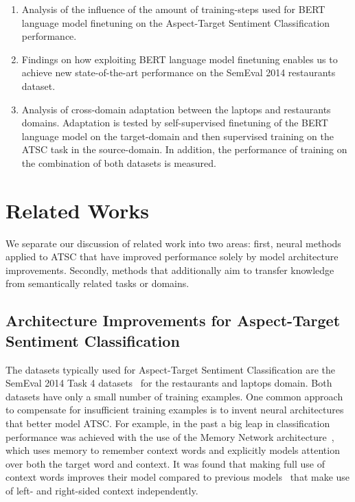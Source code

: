 \documentclass[11pt,a4paper]{article}
\begin{document}
\begin{enumerate}
\item Analysis of the influence of the amount of training-steps used for BERT language model finetuning on the Aspect-Target Sentiment Classification performance.
\item Findings on how exploiting BERT language model finetuning enables us to achieve new state-of-the-art performance on the SemEval 2014 restaurants dataset.
\item Analysis of cross-domain adaptation between the laptops and restaurants domains. Adaptation is tested by self-supervised finetuning of the BERT language model on the target-domain and then supervised training on the ATSC task in the source-domain.
  In addition, the performance of training on the combination of both datasets is measured. 
\end{enumerate}



\section{Related Works}

We separate our discussion of related work into two areas: first, neural methods applied to ATSC that have improved performance solely by model architecture improvements. Secondly, methods that additionally aim to transfer knowledge from semantically related tasks or domains.


\subsection*{Architecture Improvements for Aspect-Target Sentiment Classification}

The datasets typically used for Aspect-Target Sentiment Classification are the SemEval 2014 Task 4 datasets~\cite{Pontiki2014} for the restaurants and laptops domain. Both datasets have only a small number of training examples.
One common approach to compensate for insufficient training examples is to invent neural architectures that better model ATSC. 
For example, in the past a big leap in classification performance was achieved with the use of the Memory Network architecture~\cite{Tang2016}, which uses memory to remember context words and explicitly models attention over both the target word and context.
It was found that making full use of context words improves their model compared to previous models~\cite{Tang2015} that make use of left- and right-sided context independently.
\end{document}
